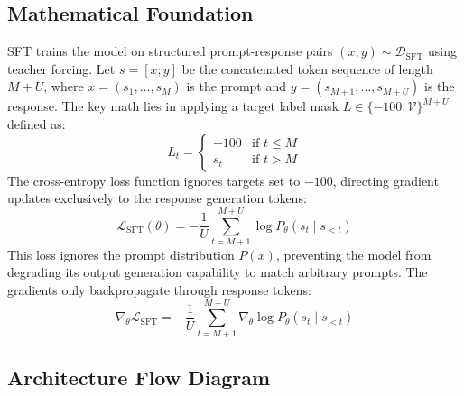 \documentclass{article}
\begin{document}
\subsection{Mathematical Foundation}
SFT trains the model on structured prompt-response pairs $(x, y) \sim \mathcal{D}_{\text{SFT}}$ using teacher forcing. Let $s = [x ; y]$ be the concatenated token sequence of length $M + U$, where $x = (s_1, \ldots, s_M)$ is the prompt and $y = (s_{M+1}, \ldots, s_{M+U})$ is the response. The key math lies in applying a target label mask $L \in \{-100, \mathcal{V}\}^{M+U}$ defined as:
\begin{equation}
  L_t = \begin{cases} -100 & \text{if } t \le M \\ s_t & \text{if } t > M \end{cases}
\end{equation}
The cross-entropy loss function ignores targets set to $-100$, directing gradient updates exclusively to the response generation tokens:
\begin{equation}
  \mathcal{L}_{\text{SFT}}(\theta) = -\frac{1}{U} \sum_{t=M+1}^{M+U} \log P_\theta(s_t \mid s_{<t})
\end{equation}
This loss ignores the prompt distribution $P(x)$, preventing the model from degrading its output generation capability to match arbitrary prompts.
The gradients only backpropagate through response tokens:
\begin{equation}
  \nabla_\theta \mathcal{L}_{\text{SFT}} = -\frac{1}{U} \sum_{t=M+1}^{M+U} \nabla_\theta \log P_\theta(s_t \mid s_{<t})
\end{equation}

\subsection{Architecture Flow Diagram}
\end{document}
